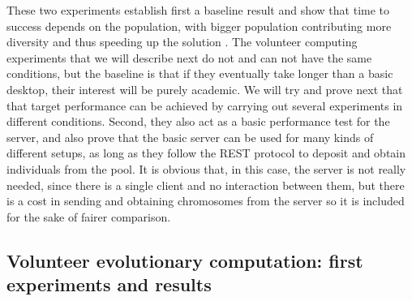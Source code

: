 \documentclass[journal,onecolumn]{IEEEtran}
\begin{document}
These two experiments establish first a baseline result and show that
time to success depends on the population, with bigger population
contributing more diversity and thus speeding up the solution \cite{DBLP:conf/lion/LaredoDFGB13}. The volunteer computing
experiments that we 
will describe next do not and can not have the same conditions, but
the baseline is that if they eventually take longer than a basic
desktop, their interest will be purely academic. We will try and
prove next that that target performance can be achieved by carrying
out several experiments in different conditions. Second, they also act
as a basic performance test for the server, and also prove that the
basic server can be used for many kinds of different setups, as long
as they follow the REST protocol to deposit and obtain individuals
from the pool. It is obvious that, in this case, the server is not
really needed, since there is a single client and no interaction
between them, but there is a cost in sending and obtaining chromosomes
from the server so it is included for the sake of fairer comparison.

\subsection{Volunteer evolutionary computation: first experiments and results}
\end{document}
